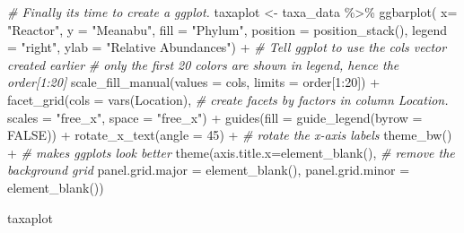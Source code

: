 \documentclass[
]{book}
\newenvironment{Shaded}{\begin{snugshade}}{\end{snugshade}}
\newcommand{\AttributeTok}[1]{\textcolor[rgb]{0.77,0.63,0.00}{#1}}
\newcommand{\CommentTok}[1]{\textcolor[rgb]{0.56,0.35,0.01}{\textit{#1}}}
\newcommand{\ConstantTok}[1]{\textcolor[rgb]{0.00,0.00,0.00}{#1}}
\newcommand{\DecValTok}[1]{\textcolor[rgb]{0.00,0.00,0.81}{#1}}
\newcommand{\FunctionTok}[1]{\textcolor[rgb]{0.00,0.00,0.00}{#1}}
\newcommand{\NormalTok}[1]{#1}
\newcommand{\OtherTok}[1]{\textcolor[rgb]{0.56,0.35,0.01}{#1}}
\newcommand{\SpecialCharTok}[1]{\textcolor[rgb]{0.00,0.00,0.00}{#1}}
\newcommand{\StringTok}[1]{\textcolor[rgb]{0.31,0.60,0.02}{#1}}
\begin{document}
\begin{Shaded}
\begin{Highlighting}[]
\CommentTok{\# Finally its time to create a ggplot. }
\NormalTok{taxaplot }\OtherTok{\textless{}{-}}\NormalTok{ taxa\_data }\SpecialCharTok{\%\textgreater{}\%}
    \FunctionTok{ggbarplot}\NormalTok{( }\AttributeTok{x=} \StringTok{"Reactor"}\NormalTok{, }
               \AttributeTok{y =} \StringTok{"Meanabu"}\NormalTok{, }
               \AttributeTok{fill =} \StringTok{"Phylum"}\NormalTok{,}
               \AttributeTok{position =} \FunctionTok{position\_stack}\NormalTok{(),}
               \AttributeTok{legend =} \StringTok{"right"}\NormalTok{,}
               \AttributeTok{ylab =} \StringTok{"Relative Abundances"}\NormalTok{) }\SpecialCharTok{+}
            \CommentTok{\# Tell ggplot to use the \textasciigrave{}cols\textasciigrave{} vector created earlier}
            \CommentTok{\# only the first 20 colors are shown in legend, hence the \textasciigrave{}order[1:20]\textasciigrave{}}
    \FunctionTok{scale\_fill\_manual}\NormalTok{(}\AttributeTok{values =}\NormalTok{ cols, }
                      \AttributeTok{limits =}\NormalTok{ order[}\DecValTok{1}\SpecialCharTok{:}\DecValTok{20}\NormalTok{]) }\SpecialCharTok{+}   
    \FunctionTok{facet\_grid}\NormalTok{(}\AttributeTok{cols =} \FunctionTok{vars}\NormalTok{(Location),     }\CommentTok{\# create facets by factors in column \textasciigrave{}Location\textasciigrave{}.}
               \AttributeTok{scales =} \StringTok{"free\_x"}\NormalTok{,}
               \AttributeTok{space =} \StringTok{"free\_x"}\NormalTok{) }\SpecialCharTok{+}
    \FunctionTok{guides}\NormalTok{(}\AttributeTok{fill =} \FunctionTok{guide\_legend}\NormalTok{(}\AttributeTok{byrow =} \ConstantTok{FALSE}\NormalTok{)) }\SpecialCharTok{+} 
    \FunctionTok{rotate\_x\_text}\NormalTok{(}\AttributeTok{angle =} \DecValTok{45}\NormalTok{) }\SpecialCharTok{+}           \CommentTok{\# rotate the x{-}axis labels}
    \FunctionTok{theme\_bw}\NormalTok{() }\SpecialCharTok{+}                          \CommentTok{\# makes ggplots look better}
    \FunctionTok{theme}\NormalTok{(}\AttributeTok{axis.title.x=}\FunctionTok{element\_blank}\NormalTok{(),   }\CommentTok{\# remove the background grid}
          \AttributeTok{panel.grid.major =} \FunctionTok{element\_blank}\NormalTok{(),}
          \AttributeTok{panel.grid.minor =} \FunctionTok{element\_blank}\NormalTok{()) }

\NormalTok{taxaplot}
\end{Highlighting}
\end{Shaded}
\end{document}

